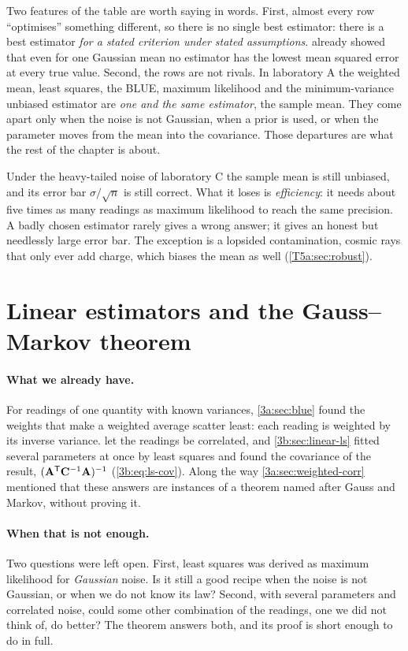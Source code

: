 Two features of the table are worth saying in words. First, almost every
row ``optimises'' something different, so there is no single best
estimator: there is a best estimator \emph{for a stated criterion under
stated assumptions}.  already showed that even for
one Gaussian mean no estimator has the lowest mean squared error at every
true value. Second, the rows are not rivals. In laboratory A the weighted
mean, least squares, the BLUE, maximum likelihood and the minimum-variance
unbiased estimator are \emph{one and the same estimator}, the sample mean.
They come apart only when the noise is not Gaussian, when a prior is used,
or when the parameter moves from the mean into the covariance. Those
departures are what the rest of the chapter is about.

\begin{pitfall}
Under the heavy-tailed noise of laboratory C the sample mean is still
unbiased, and its error bar $\sigma/\sqrt n$ is still correct. What it loses
is \emph{efficiency}: it needs about five times as many readings as maximum
likelihood to reach the same precision. A badly chosen estimator rarely
gives a wrong answer; it gives an honest but needlessly large error bar. The
exception is a lopsided contamination, cosmic rays that only ever add
charge, which biases the mean as well (\cref{T5a:sec:robust}).
\end{pitfall}
\section{Linear estimators and the Gauss--Markov theorem}
\label{T5a:sec:blue}

\paragraph{What we already have.}
For readings of one quantity with known variances, \cref{3a:sec:blue} found
the weights that make a weighted average scatter least: each reading is
weighted by its inverse variance.  let the
readings be correlated, and \cref{3b:sec:linear-ls} fitted several
parameters at once by least squares and found the covariance of the result,
$(\mathbf A^{\mathsf{T}}\mathbf{C}^{-1}\mathbf A)^{-1}$ (\cref{3b:eq:ls-cov}). Along the way
\cref{3a:sec:weighted-corr} mentioned that these answers are instances of a
theorem named after Gauss and Markov, without proving it.

\paragraph{When that is not enough.}
Two questions were left open. First, least squares was derived as maximum
likelihood for \emph{Gaussian} noise. Is it still a good recipe when the
noise is not Gaussian, or when we do not know its law? Second, with several
parameters and correlated noise, could some other combination of the
readings, one we did not think of, do better? The theorem answers both, and
its proof is short enough to do in full.

